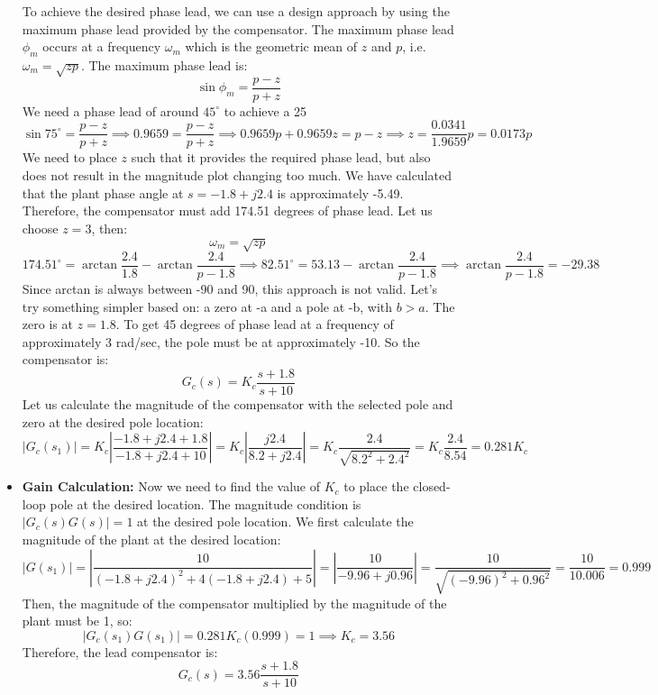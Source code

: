 \begin{mdframed}[linecolor=gray!80!black, backgroundcolor=gray!10!white, linewidth=1pt, roundcorner=5pt, frametitle=Solution]
\begin{itemize}
    To achieve the desired phase lead, we can use a design approach by using the maximum phase lead provided by the compensator. The maximum phase lead \( \phi_m \) occurs at a frequency \( \omega_m \) which is the geometric mean of \( z \) and \( p \), i.e. \( \omega_m = \sqrt{zp} \). The maximum phase lead is:
    \[
    \sin \phi_m = \frac{p-z}{p+z}
    \]
    We need a phase lead of around \(45^\circ\) to achieve a 25%
    \[
    \sin 75^\circ = \frac{p-z}{p+z} \implies 0.9659 = \frac{p-z}{p+z} \implies 0.9659p + 0.9659z = p-z \implies z = \frac{0.0341}{1.9659} p = 0.0173 p
    \]
    We need to place \(z\) such that it provides the required phase lead, but also does not result in the magnitude plot changing too much. We have calculated that the plant phase angle at \(s=-1.8+j2.4\) is approximately -5.49. Therefore, the compensator must add 174.51 degrees of phase lead. Let us choose \(z= 3\), then:
    \[
    \omega_m = \sqrt{zp}
    \]
    \[
    174.51^\circ = \arctan\frac{2.4}{1.8} - \arctan \frac{2.4}{p-1.8} \implies 82.51^\circ = 53.13 - \arctan \frac{2.4}{p-1.8} \implies \arctan \frac{2.4}{p-1.8} = -29.38
    \]
    Since arctan is always between -90 and 90, this approach is not valid. Let's try something simpler based on: a zero at -a and a pole at -b, with \(b>a\). The zero is at \(z=1.8\). To get 45 degrees of phase lead at a frequency of approximately 3 rad/sec, the pole must be at approximately -10. So the compensator is:
    \[
    G_c(s) = K_c \frac{s+1.8}{s+10}
    \]
    Let us calculate the magnitude of the compensator with the selected pole and zero at the desired pole location:
    \[
    |G_c(s_1)| = K_c \left| \frac{-1.8 + j2.4 + 1.8}{-1.8 + j2.4 + 10}\right| = K_c \left| \frac{j2.4}{8.2 + j2.4} \right| = K_c \frac{2.4}{\sqrt{8.2^2 + 2.4^2}} = K_c \frac{2.4}{8.54} = 0.281 K_c
    \]
    
    \item \textbf{Gain Calculation:} Now we need to find the value of  \(K_c\) to place the closed-loop pole at the desired location. The magnitude condition is \( |G_c(s)G(s)| = 1 \) at the desired pole location. We first calculate the magnitude of the plant at the desired location:
    \[
    |G(s_1)| = \left|\frac{10}{(-1.8 + j2.4)^2 + 4(-1.8 + j2.4) + 5}\right| = \left|\frac{10}{-9.96 + j0.96}\right| = \frac{10}{\sqrt{(-9.96)^2+0.96^2}} = \frac{10}{10.006}=0.999
    \]
    Then, the magnitude of the compensator multiplied by the magnitude of the plant must be 1, so:
    \[
    |G_c(s_1) G(s_1)|= 0.281K_c(0.999) = 1 \implies K_c = 3.56
    \]
    Therefore, the lead compensator is:
    \[
    G_c(s) = 3.56 \frac{s+1.8}{s+10}
    \]
\end{itemize}


\end{mdframed}
